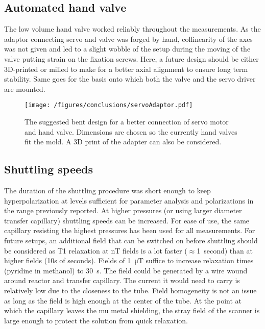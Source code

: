         \subsection{Automated hand valve}
            The low volume hand valve worked reliably throughout the measurements. As the adaptor connecting servo and valve was forged by hand, collinearity of the axes was not given and led to a slight wobble of the setup during the moving of the valve putting strain on the fixation screws. Here, a future design should be either 3D-printed or milled to make for a better axial alignment to ensure long term stability. Same goes for the basis onto which both the valve and the servo driver are mounted.
            \begin{figure}
                \centering
                \texttt{[image: /figures/conclusions/servoAdaptor.pdf]}
                \label{fig:conclusions:servoAdaptor}
                \caption[Servo adaptor]{The suggested bent design for a better connection of servo motor and hand valve. Dimensions are chosen so the currently hand valves fit the mold. A 3D print of the adapter can also be considered.}
            \end{figure}
        \subsection{Shuttling speeds}
        The duration of the shuttling procedure was short enough to keep hyperpolarization at levels sufficient for parameter analysis and polarizations in the range previously reported. At higher pressures (or using larger diameter transfer capillary) shuttling speeds can be increased. For ease of use, the same capillary resisting the highest pressures has been used for all measurements. For future setups, an additional field that can be switched on before shuttling should be considered as T1 relaxation at \si{\nano\tesla} fields is a lot faster ($\approx$\SI{1}{second}) than at higher fields (10s of seconds). Fields of \SI{1}{\micro\tesla} suffice to increase relaxation times (pyridine in methanol) to \SI{30}{\second}. The field could be generated by a wire wound around reactor and transfer capillary. The current it would need to carry is relatively low due to the closeness to the tube. Field homogeneity is not an issue as long as the field is high enough at the center of the tube. At the point at which the capillary leaves the mu metal shielding, the stray field of the scanner is large enough to protect the solution from quick relaxation.
